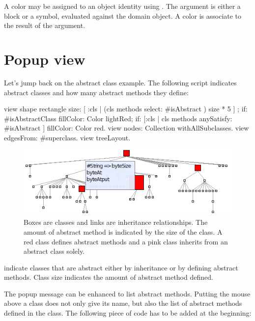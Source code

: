 \documentclass[a4paper,10pt,twoside]{book}
\begin{document}
A color may be assigned to an object identity using . The argument is either a block or a symbol, evaluated against the domain object. A color is associate to the result of the argument.


\section{Popup view}

Let's jump back on the abstract class example. The following script indicates abstract classes and how many abstract methods they define:

\begin{code}{}
view shape rectangle
	size: [ :cls | (cls methods select:  #isAbstract ) size * 5 ] ;
	if: #isAbstractClass fillColor: Color lightRed;
	if: [:cls | cls methods anySatisfy: #isAbstract ] fillColor: Color red.
view nodes: Collection withAllSubclasses.
view edgesFrom: #superclass.
view treeLayout.
\end{code}

\begin{figure}[htbp]
\centerline{\includegraphics[width=0.6\linewidth]{abstractClasses2.png}}
\caption{Boxes are classes and links are inheritance relationships. The amount of abstract method is indicated by the size of the class. A red class defines abstract methods and a pink class inherits from an abstract class solely.}
\label{fig:abstractClasses2}
\end{figure}

 indicate classes that are abstract either by inheritance or by defining abstract methods. Class size indicates the amount of abstract method defined. 

The popup message can be enhanced to list abstract methods. Putting the mouse above a class does not only give its name, but also the list of abstract methods defined in the class. The following piece of code has to be added at the beginning:

\end{document}
